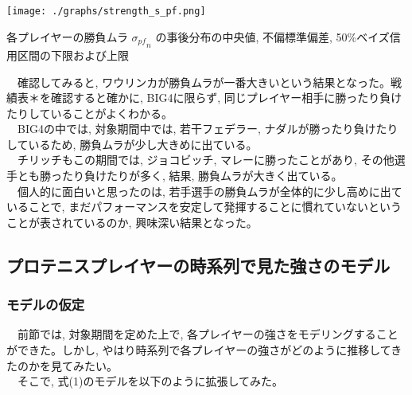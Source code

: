 \documentclass[uplatex,9pt,a5j]{jsarticle}
\begin{document}
\begin{table}[htbp]
  \begin{center}
    \texttt{[image: ./graphs/strength\_s\_pf.png]}
    \caption{各プレイヤーの勝負ムラ ${\sigma_{pf}}_n$ の事後分布の中央値, 不偏標準偏差, 50\%ベイズ信用区間の下限および上限}
    \label{tb:tb_strength_s_pf}
  \end{center}
\end{table}
　確認してみると, ワウリンカが勝負ムラが一番大きいという結果となった。戦績表＊を確認すると確かに, BIG4に限らず, 同じプレイヤー相手に勝ったり負けたりしていることがよくわかる。\\
　BIG4の中では, 対象期間中では, 若干フェデラー, ナダルが勝ったり負けたりしているため, 勝負ムラが少し大きめに出ている。\\
　チリッチもこの期間では, ジョコビッチ, マレーに勝ったことがあり, その他選手とも勝ったり負けたりが多く, 結果, 勝負ムラが大きく出ている。\\
　個人的に面白いと思ったのは, 若手選手の勝負ムラが全体的に少し高めに出ていることで, まだパフォーマンスを安定して発揮することに慣れていないということが表されているのか, 興味深い結果となった。\\
 
\subsection{プロテニスプレイヤーの時系列で見た強さのモデル}
\subsubsection{モデルの仮定}
　前節では, 対象期間を定めた上で, 各プレイヤーの強さをモデリングすることができた。しかし, やはり時系列で各プレイヤーの強さがどのように推移してきたのかを見てみたい。\\
　そこで, 式(1)のモデルを以下のように拡張してみた。\\
\end{document}
